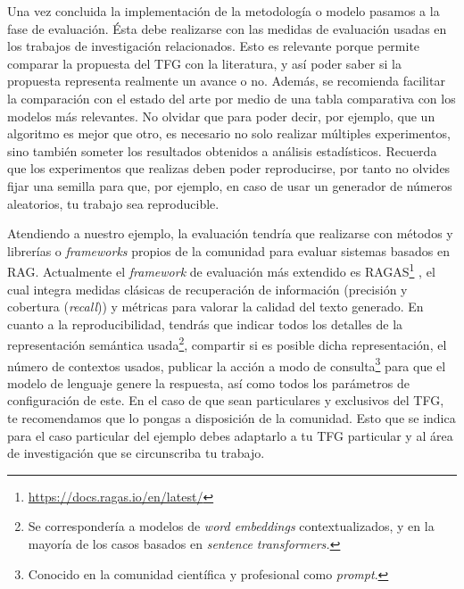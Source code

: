 Una vez concluida la implementación de la metodología o modelo pasamos a la fase de evaluación. Ésta debe realizarse con las medidas de evaluación usadas en los trabajos de investigación relacionados. Esto es relevante porque permite comparar la propuesta del TFG con la literatura, y así poder saber si la propuesta representa realmente un avance o no. Además, se recomienda facilitar la comparación con el estado del arte por medio de una tabla comparativa con los modelos más relevantes. No olvidar que para poder decir, por ejemplo, que un algoritmo es mejor que otro, es necesario no solo realizar múltiples experimentos, sino también someter los resultados obtenidos a análisis estadísticos. Recuerda que los experimentos que realizas deben poder reproducirse, por tanto no olvides fijar una semilla para que, por ejemplo, en caso de usar un generador de números aleatorios, tu trabajo sea reproducible. 

Atendiendo a nuestro ejemplo, la evaluación tendría que realizarse con métodos y librerías o \textit{frameworks} propios de la comunidad para evaluar sistemas basados en RAG. Actualmente el \textit{framework} de evaluación más extendido es RAGAS\footnote{\url{https://docs.ragas.io/en/latest/}} \cite{esetal2024Ragas}, el cual integra medidas clásicas de recuperación de información (precisión y cobertura (\textit{recall})) y métricas para valorar la calidad del texto generado. En cuanto a la reproducibilidad, tendrás que indicar todos los detalles de la representación semántica usada\footnote{Se correspondería a modelos de \textit{word embeddings} contextualizados, y en la mayoría de los casos basados en \textit{sentence transformers.}}, compartir si es posible dicha representación, el número de contextos usados, publicar la acción a modo de consulta\footnote{Conocido en la comunidad científica y profesional como \textit{prompt}.} para que el modelo de lenguaje genere la respuesta, así como todos los parámetros de configuración de este. En el caso de que sean particulares y exclusivos del TFG, te recomendamos que lo pongas a disposición de la comunidad. Esto que se indica para el caso particular del ejemplo debes adaptarlo a tu TFG particular y al área de investigación que se circunscriba tu trabajo.

